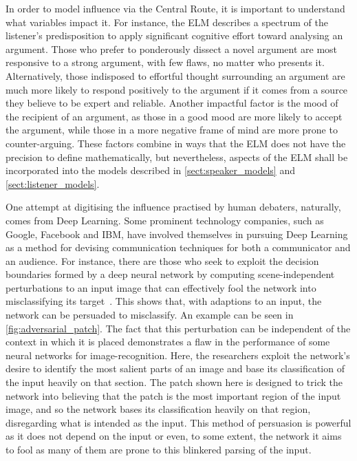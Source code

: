 In order to model influence via the Central Route, it is important to understand what variables impact it. For instance, the ELM describes a spectrum of the listener's predisposition to apply significant cognitive effort toward analysing an argument. Those who prefer to ponderously dissect a novel argument are most responsive to a strong argument, with few flaws, no matter who presents it. Alternatively, those indisposed to effortful thought surrounding an argument are much more likely to respond positively to the argument if it comes from a source they believe to be expert and reliable. Another impactful factor is the mood of the recipient of an argument, as those in a good mood are more likely to accept the argument, while those in a more negative frame of mind are more prone to counter-arguing. These factors combine in ways that the ELM does not have the precision to define mathematically, but nevertheless, aspects of the ELM shall be incorporated into the models described in \cref{sect:speaker_models} and \cref{sect:listener_models}.
 
 
One attempt at digitising the influence practised by human debaters, naturally, comes from Deep Learning. Some prominent technology companies, such as Google, Facebook and IBM, have involved themselves in pursuing Deep Learning as a method for devising communication techniques for both a communicator and an audience.  For instance, there are those who seek to exploit the decision boundaries formed by a deep neural network by computing scene-independent perturbations to an input image that can effectively fool the network into misclassifying its target~\cite{Goodfellow2014ExplainingExamples, Brown2017AdversarialPatch}. This shows that, with adaptions to an input, the network can be persuaded to misclassify. An example can be seen in \cref{fig:adversarial_patch}. The fact that this perturbation can be independent of the context in which it is placed demonstrates a flaw in the performance of some neural networks for image-recognition. Here, the researchers exploit the network's desire to identify the most salient parts of an image and base its classification of the input heavily on that section. The patch shown here is designed to trick the network into believing that the patch is the most important region of the input image, and so the network bases its classification heavily on that region, disregarding what is intended as the input. This method of persuasion is powerful as it does not depend on the input or even, to some extent, the network it aims to fool as many of them are prone to this blinkered parsing of the input. 



